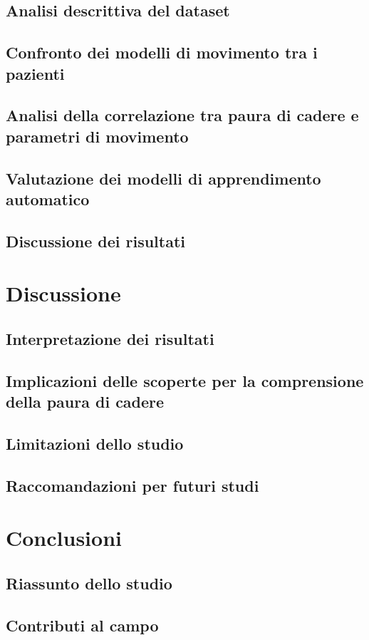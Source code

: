 \documentclass[binding=0.6cm]{sapthesis}
\begin{document}
    \section{Analisi descrittiva del dataset}
    \section{Confronto dei modelli di movimento tra i pazienti}
    \section{Analisi della correlazione tra paura di cadere e parametri di movimento}
    \section{Valutazione dei modelli di apprendimento automatico}
    \section{Discussione dei risultati}
\chapter{Discussione}
    \section{Interpretazione dei risultati}
    \section{Implicazioni delle scoperte per la comprensione della paura di cadere}
    \section{Limitazioni dello studio}
    \section{Raccomandazioni per futuri studi}
\chapter{Conclusioni}
    \section{Riassunto dello studio}
    \section{Contributi al campo}
\end{document}
